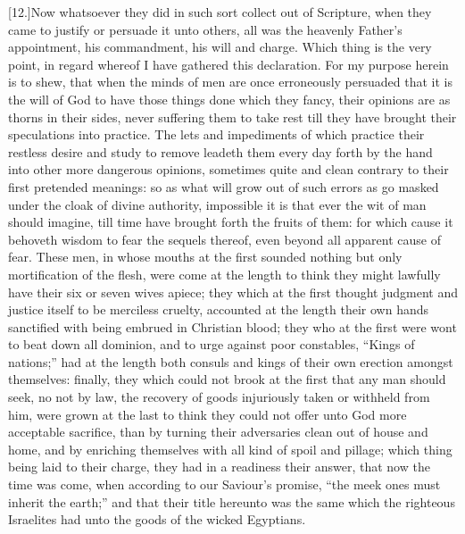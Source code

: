 [12.]Now whatsoever they did in such sort collect out of Scripture, when they came to justify or persuade it unto others, all was the heavenly Father’s appointment, his commandment, his will and charge. Which thing is the very point, in regard whereof I have gathered this declaration. For my purpose herein is to shew, that when the minds of men are once erroneously persuaded that it is the will of God to have those things done which they fancy, their opinions are as thorns in their sides, never suffering them to take rest till they have brought their speculations into practice. The lets and impediments of which practice their restless desire and study to remove leadeth them every day forth by the hand into other more dangerous opinions, sometimes quite and clean contrary to their first pretended meanings: so as what will grow out of such errors as go masked under the cloak of divine authority, impossible it is that ever the wit of man should imagine, till time have brought forth the fruits of them: for which cause it behoveth wisdom to fear the sequels thereof, even beyond all apparent cause of fear. These men, in whose mouths at the first sounded nothing but only mortification of the flesh, were come at the length to think they might lawfully have their six or seven wives apiece; they which at the first thought judgment and justice itself to be merciless cruelty, accounted at the length their own hands sanctified with being embrued in Christian blood; they who at the first were wont to beat down all dominion, and to urge against poor constables, “Kings of nations;” had at the length both consuls and kings of their own erection amongst themselves: finally, they which could not brook at the first that any man should seek, no not by law, the recovery of goods injuriously taken or withheld from him, were grown at the last to think they could not offer unto God more acceptable sacrifice, than by turning their adversaries clean out of house and home, and by enriching themselves with all kind of spoil and pillage; which thing being laid to their charge, they had in a readiness their answer, that now the time was come, when according to our Saviour’s promise, “the meek ones must inherit the earth;” and that their title hereunto was the same which the righteous Israelites had unto the goods of the wicked Egyptians.


